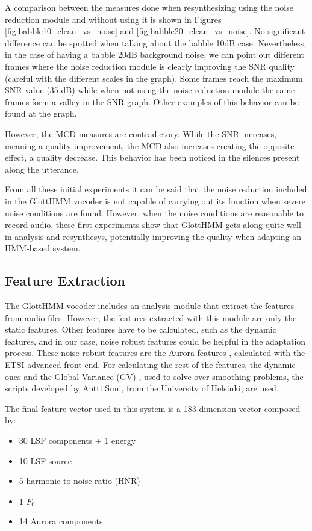 A comparison between the measures done when resynthesizing using the noise reduction module and without using it is shown in Figures \ref{fig:babble10_clean_vs_noise} and \ref{fig:babble20_clean_vs_noise}. 
%
No significant difference can be spotted when talking about the babble 10dB case.
%
Nevertheless, in the case of having a babble 20dB background noise, we can point out different frames where the noise reduction module is clearly improving the SNR quality (careful with the different scales in the graph).
%
Some frames reach the maximum SNR value (35 dB) while when not using the noise reduction module the same frames form a valley in the SNR graph.
%
Other examples of this behavior can be found at the graph.

However, the MCD measures are contradictory. 
%
While the SNR increases, meaning a quality improvement, the MCD also increases creating the opposite effect, a quality decrease.
%
This behavior has been noticed in the silences present along the utterance.

From all these initial experiments it can be said that the noise reduction included in the GlottHMM vocoder is not capable of carrying out its function when severe noise conditions are found.
%
However, when the noise conditions are reasonable to record audio, these first experiments show that GlottHMM gets along quite well in analysis and resynthesys, potentially improving the quality when adapting an HMM-based system. 

\subsection{Feature Extraction}
\label{experiments_feature_extraction}
The GlottHMM vocoder includes an analysis module that extract the features from audio files.
%
However, the features extracted with this module are only the static features. 
%
Other features have to be calculated, such as the dynamic features, and in our case, noise robust features could be helpful in the adaptation process.
%
These noise robust features are the Aurora features \cite{etsi202}, calculated with the ETSI advanced front-end.
%
For calculating the rest of the features, the dynamic ones and the Global Variance (GV) \cite{toda2005speech}, used to solve over-smoothing problems, the scripts developed by Antti Suni, from the University of Helsinki, are used.

The final feature vector used in this system is a 183-dimension vector composed by:

\begin{itemize}
	\item 30 LSF components + 1 energy
	\item 10 LSF source
	\item 5 harmonic-to-noise ratio (HNR)
	\item 1  $F_{0}$
	\item 14 Aurora components
\end{itemize}


